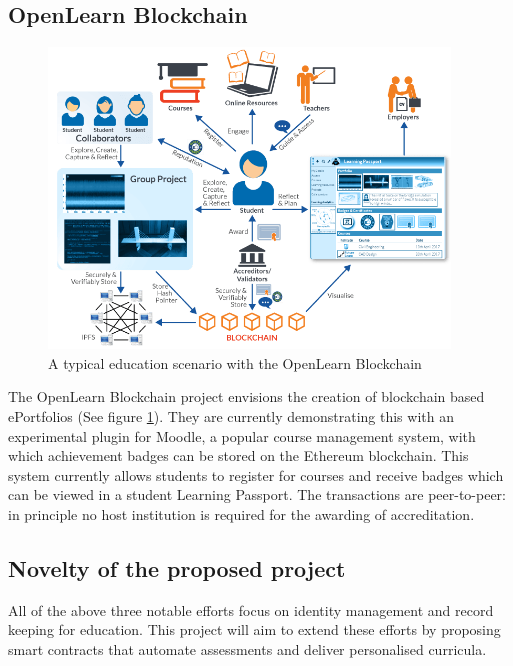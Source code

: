 \subsection{OpenLearn Blockchain}%

\begin{figure}[!ht] 
    \centering    
    \includegraphics[width=0.95\textwidth]{openlearn}
    \caption[OpenLearn Blockchain scenario]
        {A typical education scenario with the OpenLearn Blockchain\citep{openlearn2018}}
    \label{fig:openlearn}
\end{figure}

The OpenLearn Blockchain project envisions the creation of blockchain based ePortfolios (See figure 
\ref{fig:openlearn}). They are currently demonstrating this with an experimental plugin for Moodle, 
a popular course management system, with which achievement badges can be stored on the Ethereum 
blockchain. This system currently allows students to register for courses and receive badges which 
can be viewed in a student Learning Passport. The transactions are peer-to-peer: in principle no 
host institution is required for the awarding of accreditation. \citep{sharples2016blockchain}

\subsection{Novelty of the proposed project}

All of the above three notable efforts focus on identity management and record keeping for education. 
This project will aim to extend these efforts by proposing smart contracts that automate assessments 
and deliver personalised curricula.

